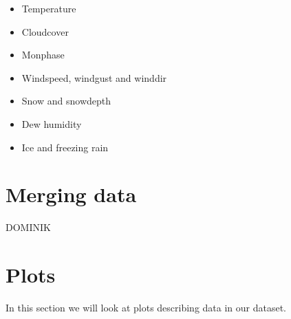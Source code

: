 \documentclass{article}
\begin{document}
			\begin{itemize}
\item Temperature
\item Cloudcover
\item Monphase
\item Windspeed, windgust and winddir
\item Snow and snowdepth
\item Dew humidity
\item Ice and freezing rain
				
			\end{itemize}


\section{Merging data}

DOMINIK

\section{Plots}
In this section we will look at plots describing data in our dataset.
	
\end{document}
